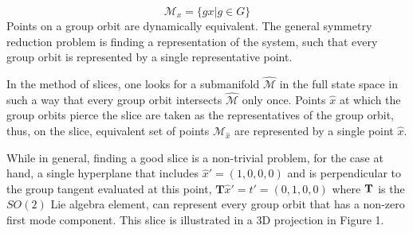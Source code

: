 \color{black}
\begin{equation}
	\mathcal{M}_x = \{g x | g \in G\} \nonumber
\end{equation}
Points on a group orbit are dynamically equivalent. The general symmetry
reduction problem is finding a representation of the system,  such that every 
group orbit is represented by a single representative point.

In the method of slices, one looks for a submanifold $\hat{\mathcal{M}}$ in 
the full state space in such a way that every group orbit intersects $\hat{\mathcal{M}}$ 
only once. Points $\hat{x}$ at which the group orbits pierce the slice are taken
as the representatives of the group orbit, thus, on the slice, equivalent set
of points $\mathcal{M}_{\hat{x}}$ are represented by a single point $\hat{x}$.

While in general, finding a good slice is a non-trivial problem, for the case
at hand, a single hyperplane that includes $\hat{x}' = (1,0,0,0)$ and is perpendicular
to the group tangent evaluated at this point, $\textbf{T} \hat{x}' = t' = (0,1,0,0)$ where
$\bf{T}$ is the $SO(2)$ Lie algebra element, can represent every group orbit 
that has a non-zero first mode component. This slice is illustrated in a 3D 
projection in Figure 1.
